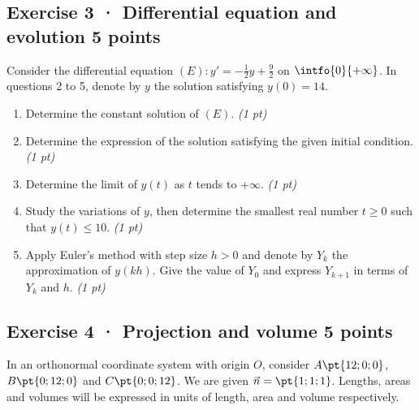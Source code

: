 \mxnewpage{}

\subsection*{Exercise 3 · Differential equation and evolution \hfill 5 points}Consider the differential equation $(E):y'=-\frac1{2}y+\frac{9}{2}$ on $\intfo{0}{+\infty}$. In questions 2 to 5, denote by $y$ the solution satisfying $y(0)=14$.

\begin{enumerate}

\item Determine the constant solution of $(E)$. \hfill\textit{(1 pt)}

\item Determine the expression of the solution satisfying the given initial condition. \hfill\textit{(1 pt)}

\item Determine the limit of $y(t)$ as $t$ tends to $+\infty$. \hfill\textit{(1 pt)}

\item Study the variations of $y$, then determine the smallest real number $t\ge0$ such that $y(t)\le10$. \hfill\textit{(1 pt)}

\item Apply Euler's method with step size $h>0$ and denote by $Y_k$ the approximation of $y(kh)$. Give the value of $Y_0$ and express $Y_{k+1}$ in terms of $Y_k$ and $h$. \hfill\textit{(1 pt)}

\end{enumerate}

\subsection*{Exercise 4 · Projection and volume \hfill 5 points}In an orthonormal coordinate system with origin $O$, consider $A\pt{12;0;0}$, $B\pt{0;12;0}$ and $C\pt{0;0;12}$. We are given $\vec n=\pt{1;1;1}$. Lengths, areas and volumes will be expressed in units of length, area and volume respectively.

